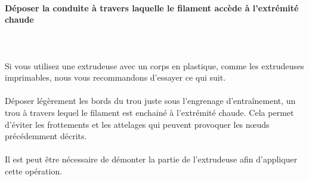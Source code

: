 \documentclass[11pt,a4paper]{article}
\begin{document}
			\paragraph{Déposer la conduite à travers laquelle le filament accède à l'extrémité chaude}\mbox{}\\\\
Si vous utilisez une extrudeuse avec un corps en plastique, comme les extrudeuses imprimables, nous vous recommandons d'essayer ce qui suit.
\\\\
Déposer légèrement les bords du trou juste sous l’engrenage d'entraînement, un trou à travers lequel le filament est enchainé à l'extrémité chaude. Cela permet d'éviter les frottements et les attelages qui peuvent provoquer les nœuds précédemment décrits.
\\\\
Il est peut être nécessaire de démonter la partie de l’extrudeuse afin d’appliquer cette opération.
\end{document}
